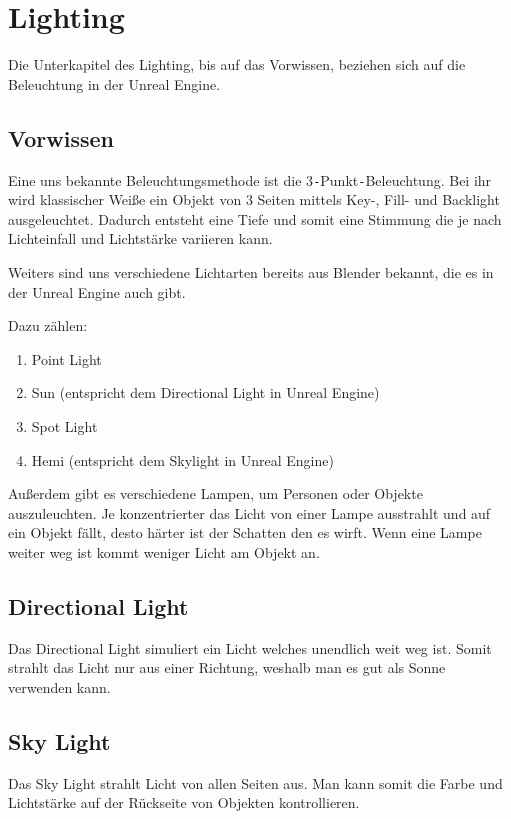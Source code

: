 \section{Lighting}
Die Unterkapitel des Lighting, bis auf das Vorwissen, beziehen sich auf die Beleuchtung in der Unreal Engine.

\subsection{Vorwissen}
Eine uns bekannte Beleuchtungsmethode ist die 3\verb+-+Punkt\verb+-+Beleuchtung. Bei ihr wird klassischer Weiße ein Objekt
von 3 Seiten mittels Key-, Fill- und Backlight ausgeleuchtet. Dadurch entsteht eine Tiefe und somit eine Stimmung die je nach Lichteinfall und
Lichtstärke variieren kann.

Weiters sind uns verschiedene Lichtarten bereits aus Blender bekannt, die es in der Unreal Engine auch gibt.

Dazu zählen:

\begin{enumerate}
    \item Point Light
    \item Sun (entspricht dem Directional Light in Unreal Engine)
    \item Spot Light
    \item Hemi (entspricht dem Skylight in Unreal Engine)
\end{enumerate}

Außerdem gibt es verschiedene Lampen, um Personen oder Objekte auszuleuchten. Je konzentrierter das Licht von einer Lampe ausstrahlt und auf ein Objekt
fällt, desto härter ist der Schatten den es wirft. Wenn eine Lampe weiter weg ist kommt weniger Licht am Objekt an.

\subsection{Directional Light}
Das Directional Light simuliert ein Licht welches unendlich weit weg ist. Somit strahlt das Licht nur aus einer Richtung, weshalb
man es gut als Sonne verwenden kann. \citep{unreal:directional_light}

\subsection{Sky Light}
Das Sky Light strahlt Licht von allen Seiten aus. Man kann somit die Farbe und Lichtstärke auf der Rückseite von Objekten kontrollieren.

